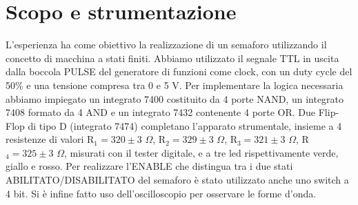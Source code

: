 \section{Scopo e strumentazione}
L'esperienza ha come obiettivo la realizzazione di un semaforo utilizzando il concetto di macchina a stati finiti. Abbiamo utilizzato il segnale TTL in uscita dalla boccola PULSE del generatore di funzioni come clock, con un duty cycle del 50\% e una tensione compresa tra 0 e 5 V. Per implementare la logica necessaria abbiamo impiegato un integrato 7400 costituito da 4 porte NAND, un integrato 7408 formato da 4 AND e un integrato 7432 contenente 4 porte OR. Due Flip-Flop di tipo D (integrato 7474) completano l'apparato strumentale, insieme a 4 resistenze di valori R$_1 = 320 \pm 3$ $\Omega$, R$_2 = 329 \pm 3$ $\Omega$, R$_3 = 321 \pm 3$ $\Omega$, R$_4 = 325 \pm 3$ $\Omega$, misurati con il tester digitale, e a tre led rispettivamente verde, giallo e rosso. Per realizzare l'ENABLE che distingua tra i due stati ABILITATO/DISABILITATO del semaforo è stato utilizzato anche uno switch a 4 bit. Si è infine fatto uso dell'oscilloscopio per osservare le forme d'onda.


